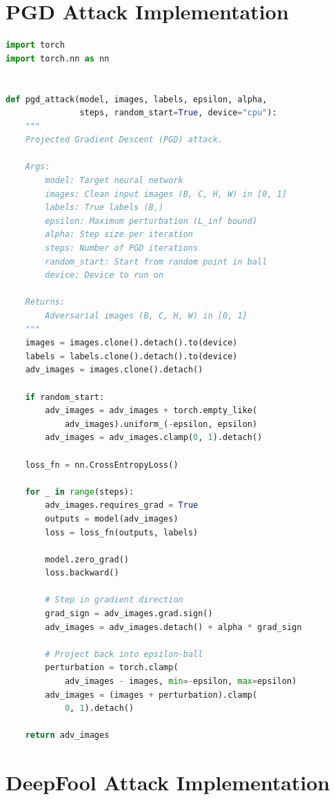 \section{PGD Attack Implementation}

\begin{lstlisting}[language=Python, caption={PGD Attack Implementation}, label={lst:pgd}]
import torch
import torch.nn as nn


def pgd_attack(model, images, labels, epsilon, alpha,
               steps, random_start=True, device="cpu"):
    """
    Projected Gradient Descent (PGD) attack.

    Args:
        model: Target neural network
        images: Clean input images (B, C, H, W) in [0, 1]
        labels: True labels (B,)
        epsilon: Maximum perturbation (L_inf bound)
        alpha: Step size per iteration
        steps: Number of PGD iterations
        random_start: Start from random point in ball
        device: Device to run on

    Returns:
        Adversarial images (B, C, H, W) in [0, 1]
    """
    images = images.clone().detach().to(device)
    labels = labels.clone().detach().to(device)
    adv_images = images.clone().detach()

    if random_start:
        adv_images = adv_images + torch.empty_like(
            adv_images).uniform_(-epsilon, epsilon)
        adv_images = adv_images.clamp(0, 1).detach()

    loss_fn = nn.CrossEntropyLoss()

    for _ in range(steps):
        adv_images.requires_grad = True
        outputs = model(adv_images)
        loss = loss_fn(outputs, labels)

        model.zero_grad()
        loss.backward()

        # Step in gradient direction
        grad_sign = adv_images.grad.sign()
        adv_images = adv_images.detach() + alpha * grad_sign

        # Project back into epsilon-ball
        perturbation = torch.clamp(
            adv_images - images, min=-epsilon, max=epsilon)
        adv_images = (images + perturbation).clamp(
            0, 1).detach()

    return adv_images
\end{lstlisting}

\section{DeepFool Attack Implementation}

